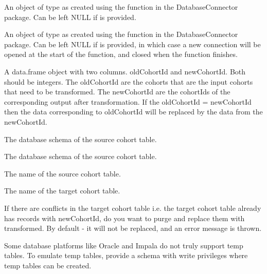 \documentclass[a4paper]{book}
\begin{document}
\begin{Arguments}
\begin{ldescription}
\item[\code{connectionDetails}] An object of type  as created using the
 function in the
DatabaseConnector package. Can be left NULL if  is
provided.

\item[\code{connection}] An object of type  as created using the
 function in the
DatabaseConnector package. Can be left NULL if 
is provided, in which case a new connection will be opened at the start
of the function, and closed when the function finishes.

\item[\code{oldToNewCohortId}] A data.frame object with two columns. oldCohortId and newCohortId. Both should be integers.
The oldCohortId are the cohorts that are the input cohorts that need to be transformed.
The newCohortId are the cohortIds of the corresponding output after transformation.
If the oldCohortId = newCohortId then the data corresponding to oldCohortId
will be replaced by the data from the newCohortId.

\item[\code{sourceCohortDatabaseSchema}] The database schema of the source cohort table.

\item[\code{targetCohortDatabaseSchema}] The database schema of the source cohort table.

\item[\code{sourceCohortTable}] The name of the source cohort table.

\item[\code{targetCohortTable}] The name of the target cohort table.

\item[\code{purgeConflicts}] If there are conflicts in the target cohort table i.e. the target cohort table
already has records with newCohortId, do you want to purge and replace them
with transformed. By default - it will not be replaced, and an error message is thrown.

\item[\code{tempEmulationSchema}] Some database platforms like Oracle and Impala do not truly support
temp tables. To emulate temp tables, provide a schema with write
privileges where temp tables can be created.
\end{ldescription}
\end{Arguments}
\end{document}
